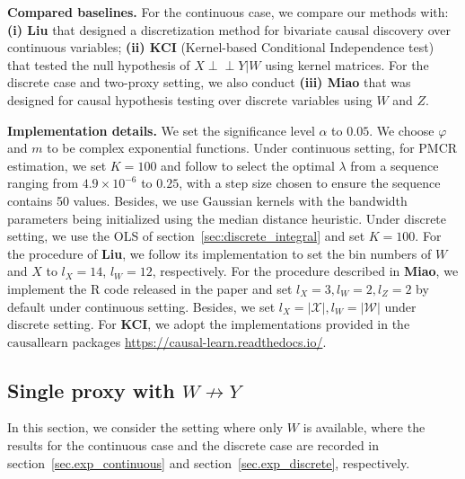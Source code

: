 \documentclass[
  12pt]{article}
\def\to{\rightarrow}
\newcommand{\ind}{\perp\!\!\!\!\perp}
\begin{document}

\textbf{Compared baselines.} For the continuous case, we compare our methods with: \textbf{(i) Liu} \citep{liu2023causal} that designed a discretization method for bivariate causal discovery over continuous variables; \textbf{(ii) KCI} (Kernel-based Conditional Independence test) \citep{zhang2012kernel} that tested the null hypothesis of $X\ind Y|W$ using kernel matrices. For the discrete case and two-proxy setting, we also conduct \textbf{(iii) Miao} \citep{miao2018identifying} that was designed for causal hypothesis testing over discrete variables using $W$ and $Z$. 


\textbf{Implementation details.} We set the significance level $\alpha$ to $0.05$. We choose $\varphi$ and $m$ to be complex exponential functions. Under continuous setting, for PMCR estimation, we set $K = 100$ and follow \citep{mastouri2021proximal} to select the optimal $\lambda$ from a sequence ranging from $4.9 \times 10^{-6}$ to $0.25$, with a step size chosen to ensure the sequence contains 50 values. Besides, we use Gaussian kernels with the bandwidth parameters being initialized using the median distance heuristic. Under discrete setting, we use the OLS of section~\ref{sec:discrete_integral} and set $K = 100$. For the procedure of \textbf{Liu}, we follow its implementation to set the bin numbers of $W$ and $X$ to $l_X = 14$, $l_W = 12$, respectively.  For the procedure described in \textbf{Miao}, we implement the R code released in the paper and set $l_X = 3, l_W = 2, l_Z = 2$ by default under continuous setting. Besides, we set $l_X = |\mathcal{X}|, l_W = |\mathcal{W}|$ under discrete setting. For \textbf{KCI}, we adopt the implementations provided in the $\mathrm{causallearn}$ packages \url{https://causal-learn.readthedocs.io/}.


\subsection{Single proxy with $W \not\to Y$}\label{sec.exp-single}

In this section, we consider the setting where only $W$ is available, where the results for the continuous case and the discrete case are recorded in section~\ref{sec.exp_continuous} and section~\ref{sec.exp_discrete}, respectively. 
\end{document}
